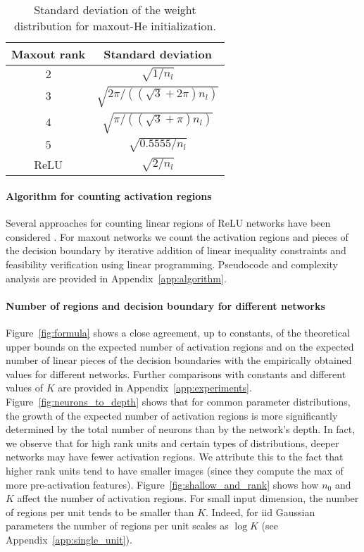\documentclass{article}
\theoremstyle{definition}
\newcommand{\nin}{n_0}
\begin{document}
\begin{table}[ht]
    \caption{Standard deviation of the weight distribution for maxout-He initialization. 
    }
    \label{tb:std}
    \centering
    {\small 
    \begin{tabular}{c%
    c}
        \toprule
        Maxout rank & 
        Standard deviation \\
        \midrule
        $2$ &  
        $\sqrt{1/n_l}$ \\
        $3$ &
        $\sqrt{2 \pi /((\sqrt{3} + 2 \pi) n_l)}$ \\
        $4$ & 
        $\sqrt{ \pi /((\sqrt{3} + \pi) n_l)}$ \\
        $5$ & 
        $\sqrt{ 0.5555 / n_l}$ \\
        \midrule
        ReLU & 
        $\sqrt{2/n_l}$ \\
        \bottomrule
    \end{tabular}
    }
\end{table}

\paragraph{Algorithm for counting activation regions} 
Several approaches for counting linear regions of ReLU networks have been considered \citep[e.g.,][]{serra2018bounding, NIPS2019_8328, serra2020empirical, xiong2020number}.
For maxout networks we count the activation regions and pieces of the decision boundary by iterative addition of linear inequality constraints and feasibility verification using linear programming. 
Pseudocode and complexity analysis are provided in Appendix~\ref{app:algorithm}.

\paragraph{Number of regions and decision boundary for different networks}
Figure~\ref{fig:formula} shows a close agreement, up to constants, of the theoretical upper bounds on the expected number of activation regions and on the expected number of linear pieces of the decision boundaries with the empirically obtained values for different networks. Further comparisons with constants and different values of $K$ are provided in Appendix~\ref{app:experiments}.
Figure~\ref{fig:neurons_to_depth} shows that for common parameter distributions, the growth of the expected number of activation regions is more significantly determined by the total number of neurons than by the network's depth.
In fact, we observe that for high rank units and certain types of distributions, deeper networks may have fewer activation regions. 
We attribute this to the fact that higher rank units tend to have smaller images (since they compute the max of more pre-activation features).
Figure~\ref{fig:shallow_and_rank} shows how $\nin$ and $K$ affect the number of activation regions. 
For small input dimension, the number of regions per unit tends to be smaller than $K$. 
Indeed, for iid Gaussian parameters the number of regions per unit scales as $\log K$ (see Appendix~\ref{app:single_unit}). 
\end{document}
